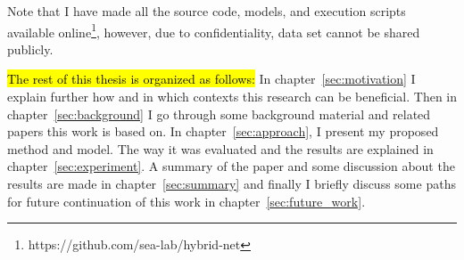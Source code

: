 Note that I have made all the source code, models, and execution scripts available online\footnote{https://github.com/sea-lab/hybrid-net}, however, due to confidentiality, data set cannot be shared publicly. 

\hl{The rest of this thesis is organized as follows:} In chapter~\ref{sec:motivation} I explain further how and in which contexts this research can be beneficial. 
Then in chapter~\ref{sec:background} I go through some background material and related papers this work is based on. 
In chapter~\ref{sec:approach}, I present my proposed method and model. The way it was evaluated and the results are explained in chapter~\ref{sec:experiment}. 
A summary of the paper and some discussion about the results are made in chapter~\ref{sec:summary} and finally I briefly discuss some paths for future continuation of this work in chapter~\ref{sec:future_work}.
